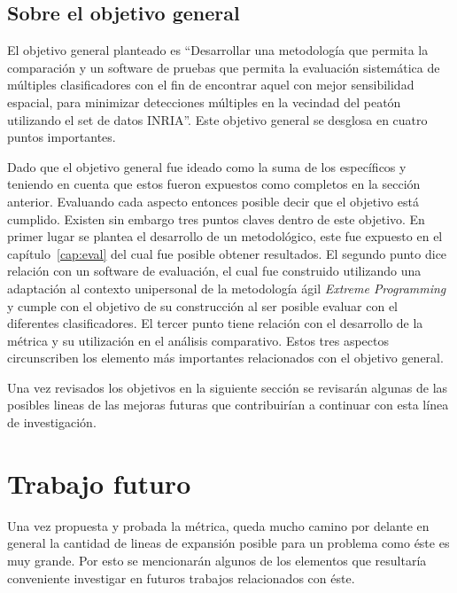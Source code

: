 \subsection{Sobre el objetivo general}


El objetivo general planteado es ``Desarrollar una metodología que permita la comparación y un software de pruebas que permita la evaluación sistemática de múltiples clasificadores con el fin de encontrar aquel con mejor sensibilidad espacial, para minimizar detecciones múltiples en la vecindad del peatón utilizando el set de datos INRIA''. Este objetivo general se desglosa en cuatro puntos importantes.

Dado que el objetivo general fue ideado como la suma de los específicos y teniendo en cuenta que estos fueron expuestos como completos en la sección anterior. Evaluando cada aspecto entonces posible decir que el objetivo está cumplido. Existen sin embargo tres puntos claves dentro de este objetivo. En primer lugar se plantea el desarrollo de un metodológico, este  fue expuesto en el capítulo~\ref{cap:eval} del cual fue posible obtener resultados. El segundo punto dice relación con un software de evaluación, el cual fue construido utilizando una adaptación al contexto unipersonal de la metodología ágil \textit{Extreme Programming} y cumple con el objetivo de su construcción al ser posible evaluar con el diferentes clasificadores. El tercer punto tiene relación con el desarrollo de la métrica y su utilización en el análisis comparativo. Estos tres aspectos circunscriben los elemento más importantes relacionados con el objetivo general. 

Una vez revisados los objetivos en la siguiente sección se revisarán algunas de las posibles lineas de las mejoras futuras que contribuirían a continuar con esta línea de investigación.


\section{Trabajo futuro}

Una vez propuesta y probada la métrica, queda mucho camino por delante en general la cantidad de lineas de expansión posible para un problema como éste es muy grande. Por esto se mencionarán algunos de los elementos que resultaría conveniente investigar en futuros trabajos relacionados con éste. 

